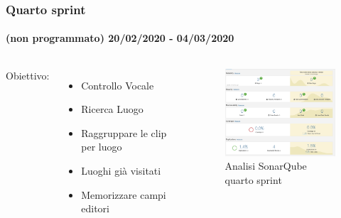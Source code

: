 \documentclass{beamer}
\begin{document}
\begin{frame}
\frametitle{Quarto sprint}
\framesubtitle{(non programmato) 20/02/2020 - 04/03/2020}
\begin{columns}
Obiettivo:
  \begin{itemize}
	\item Controllo Vocale
	\item Ricerca Luogo
	\item Raggruppare le clip per luogo
	\item Luoghi già visitati
	\item Memorizzare campi editori
  \end{itemize}
	\begin{figure}[h]
	\centering
        \includegraphics[width=5cm]{Images/SonarQube/ultimo-sprint.png}
        \caption{Analisi SonarQube quarto sprint}
   \end{figure}
\end{columns}
\end{frame}

\end{document}
